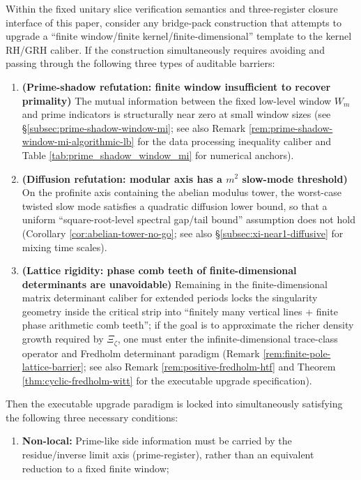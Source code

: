 \begin{theorem}\label{thm:bridge-paradigm-nonlocal-doublelimit-fredholm}
Within the fixed unitary slice verification semantics and three-register closure interface of this paper, consider any bridge-pack construction that attempts to upgrade a ``finite window/finite kernel/finite-dimensional'' template to the kernel RH/GRH caliber.
If the construction simultaneously requires avoiding and passing through the following three types of auditable barriers:
\begin{enumerate}
  \item \textbf{(Prime-shadow refutation: finite window insufficient to recover primality)}
  The mutual information between the fixed low-level window \(W_m\) and prime indicators is structurally near zero at small window sizes (see \S\ref{subsec:prime-shadow-window-mi}; see also Remark \ref{rem:prime-shadow-window-mi-algorithmic-lb} for the data processing inequality caliber and Table \ref{tab:prime_shadow_window_mi} for numerical anchors).
  \item \textbf{(Diffusion refutation: modular axis has a \(m^2\) slow-mode threshold)}
  On the profinite axis containing the abelian modulus tower, the worst-case twisted slow mode satisfies a quadratic diffusion lower bound, so that a uniform ``square-root-level spectral gap/tail bound'' assumption does not hold (Corollary \ref{cor:abelian-tower-no-go}; see also \S\ref{subsec:xi-near1-diffusive} for mixing time scales).
  \item \textbf{(Lattice rigidity: phase comb teeth of finite-dimensional determinants are unavoidable)}
  Remaining in the finite-dimensional matrix determinant caliber for extended periods locks the singularity geometry inside the critical strip into ``finitely many vertical lines + finite phase arithmetic comb teeth''; if the goal is to approximate the richer density growth required by \(\Xi_\zeta\), one must enter the infinite-dimensional trace-class operator and Fredholm determinant paradigm (Remark \ref{rem:finite-pole-lattice-barrier}; see also Remark \ref{rem:positive-fredholm-htf} and Theorem \ref{thm:cyclic-fredholm-witt} for the executable upgrade specification).
\end{enumerate}
Then the executable upgrade paradigm is locked into simultaneously satisfying the following three necessary conditions:
\begin{enumerate}
  \item \textbf{Non-local:} Prime-like side information must be carried by the residue/inverse limit axis (prime-register), rather than an equivalent reduction to a fixed finite window;

\end{enumerate}
\end{theorem}
